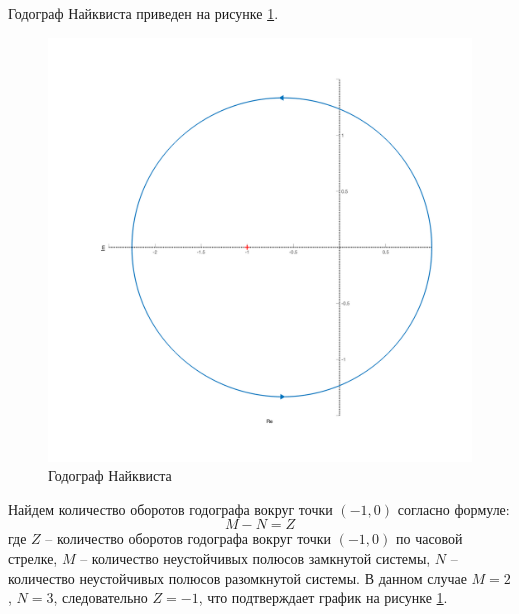 Годограф Найквиста приведен на рисунке \ref{fig:task1_nyquist}.
\begin{figure}[ht!]
    \centering
    \includegraphics[width=\textwidth]{media/plots/task1_nyquist_open.png}
    \caption{Годограф Найквиста}
    \label{fig:task1_nyquist}
\end{figure}
Найдем количество оборотов годографа вокруг точки $(-1, 0)$ согласно формуле:
\begin{equation}
    M - N = Z 
\end{equation}
где $Z$ -- количество оборотов годографа вокруг точки $(-1, 0)$ по часовой стрелке, $M$ -- количество неустойчивых полюсов замкнутой системы, $N$ -- количество неустойчивых полюсов разомкнутой системы. 
В данном случае $M = 2$, $N = 3$, следовательно $Z = -1$, что подтверждает график на рисунке \ref{fig:task1_nyquist}.

